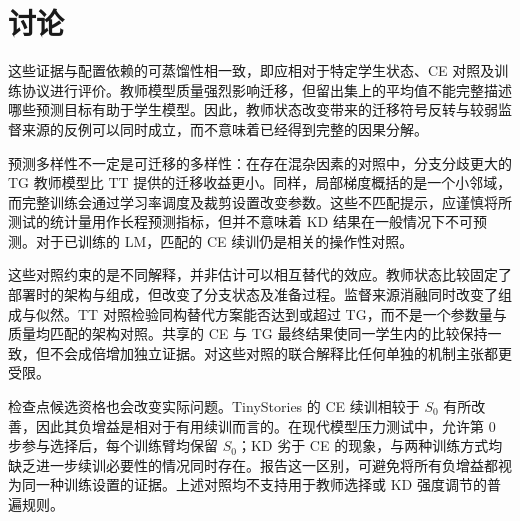 \section{讨论}\label{sec:discussion}

这些证据与配置依赖的可蒸馏性相一致，即应相对于特定学生状态、CE 对照及训练协议进行评价。教师模型质量强烈影响迁移，但留出集上的平均值不能完整描述哪些预测目标有助于学生模型。因此，教师状态改变带来的迁移符号反转与较弱监督来源的反例可以同时成立，而不意味着已经得到完整的因果分解。

预测多样性不一定是可迁移的多样性：在存在混杂因素的对照中，分支分歧更大的 TG 教师模型比 TT 提供的迁移收益更小。同样，局部梯度概括的是一个小邻域，而完整训练会通过学习率调度及裁剪设置改变参数。这些不匹配提示，应谨慎将所测试的统计量用作长程预测指标，但并不意味着 KD 结果在一般情况下不可预测。对于已训练的 LM，匹配的 CE 续训仍是相关的操作性对照。

这些对照约束的是不同解释，并非估计可以相互替代的效应。教师状态比较固定了部署时的架构与组成，但改变了分支状态及准备过程。监督来源消融同时改变了组成与似然。TT 对照检验同构替代方案能否达到或超过 TG，而不是一个参数量与质量均匹配的架构对照。共享的 CE 与 TG 最终结果使同一学生内的比较保持一致，但不会成倍增加独立证据。对这些对照的联合解释比任何单独的机制主张都更受限。

检查点候选资格也会改变实际问题。TinyStories 的 CE 续训相较于 $S_0$ 有所改善，因此其负增益是相对于有用续训而言的。在现代模型压力测试中，允许第 0 步参与选择后，每个训练臂均保留 $S_0$；KD 劣于 CE 的现象，与两种训练方式均缺乏进一步续训必要性的情况同时存在。报告这一区别，可避免将所有负增益都视为同一种训练设置的证据。上述对照均不支持用于教师选择或 KD 强度调节的普遍规则。
